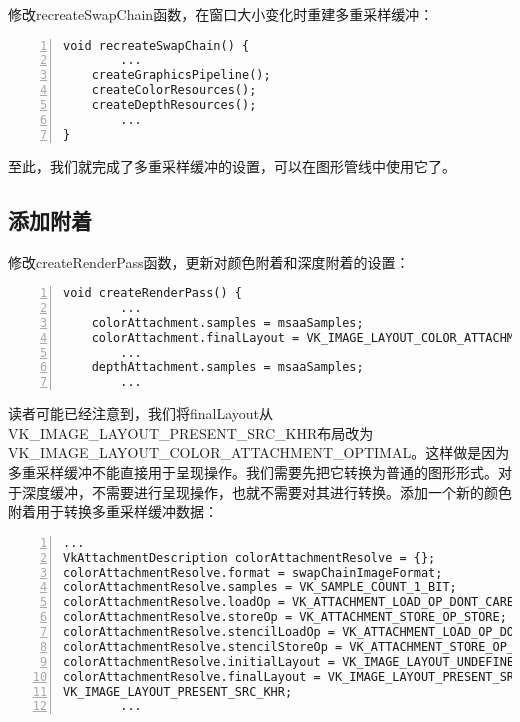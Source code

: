 \documentclass{ctexart}
\begin{document}
修改recreateSwapChain函数，在窗口大小变化时重建多重采样缓冲：

\begin{lstlisting}[language={[ANSI]C},keywordstyle=\color{blue!70},commentstyle=\color{red!50!green!50!blue!50},frame=shadowbox, rulesepcolor=\color{red!20!green!20!blue!20},basicstyle=\small,numbers=left, numberstyle=\tiny,breaklines=true]
void recreateSwapChain() {
		...
	createGraphicsPipeline();
	createColorResources();
	createDepthResources();
		...
}
\end{lstlisting}

至此，我们就完成了多重采样缓冲的设置，可以在图形管线中使用它了。

\subsection{添加附着}

修改createRenderPass函数，更新对颜色附着和深度附着的设置：

\begin{lstlisting}[language={[ANSI]C},keywordstyle=\color{blue!70},commentstyle=\color{red!50!green!50!blue!50},frame=shadowbox, rulesepcolor=\color{red!20!green!20!blue!20},basicstyle=\small,numbers=left, numberstyle=\tiny,breaklines=true]
void createRenderPass() {
		...
	colorAttachment.samples = msaaSamples;
	colorAttachment.finalLayout = VK_IMAGE_LAYOUT_COLOR_ATTACHMENT_OPTIMAL;
		...
	depthAttachment.samples = msaaSamples;
		...
\end{lstlisting}

读者可能已经注意到，我们将finalLayout从VK\_IMAGE\_LAYOUT\_PRESENT\_SRC\_KHR布局改为VK\_IMAGE\_LAYOUT\_COLOR\_ATTACHMENT\_OPTIMAL。这样做是因为多重采样缓冲不能直接用于呈现操作。我们需要先把它转换为普通的图形形式。对于深度缓冲，不需要进行呈现操作，也就不需要对其进行转换。添加一个新的颜色附着用于转换多重采样缓冲数据：

\begin{lstlisting}[language={[ANSI]C},keywordstyle=\color{blue!70},commentstyle=\color{red!50!green!50!blue!50},frame=shadowbox, rulesepcolor=\color{red!20!green!20!blue!20},basicstyle=\small,numbers=left, numberstyle=\tiny,breaklines=true]
		...
VkAttachmentDescription colorAttachmentResolve = {};
colorAttachmentResolve.format = swapChainImageFormat;
colorAttachmentResolve.samples = VK_SAMPLE_COUNT_1_BIT;
colorAttachmentResolve.loadOp = VK_ATTACHMENT_LOAD_OP_DONT_CARE;
colorAttachmentResolve.storeOp = VK_ATTACHMENT_STORE_OP_STORE;
colorAttachmentResolve.stencilLoadOp = VK_ATTACHMENT_LOAD_OP_DONT_CARE;
colorAttachmentResolve.stencilStoreOp = VK_ATTACHMENT_STORE_OP_DONT_CARE;
colorAttachmentResolve.initialLayout = VK_IMAGE_LAYOUT_UNDEFINED;
colorAttachmentResolve.finalLayout = VK_IMAGE_LAYOUT_PRESENT_SRC_KHR;
VK_IMAGE_LAYOUT_PRESENT_SRC_KHR;
		...
\end{lstlisting}
\end{document}
